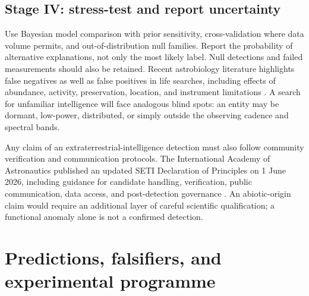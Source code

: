 \documentclass[11pt]{article}
\begin{document}
\subsection{Stage IV: stress-test and report uncertainty}

Use Bayesian model comparison with prior sensitivity, cross-validation where data volume permits, and out-of-distribution null families. Report the probability of alternative explanations, not only the most likely label. Null detections and failed measurements should also be retained. Recent astrobiology literature highlights false negatives as well as false positives in life searches, including effects of abundance, activity, preservation, location, and instrument limitations \citep{tenKate2026}. A search for unfamiliar intelligence will face analogous blind spots: an entity may be dormant, low-power, distributed, or simply outside the observing cadence and spectral bands.

Any claim of an extraterrestrial-intelligence detection must also follow community verification and communication protocols. The International Academy of Astronautics published an updated SETI Declaration of Principles on 1 June 2026, including guidance for candidate handling, verification, public communication, data access, and post-detection governance \citep{IAA2026}. An abiotic-origin claim would require an additional layer of careful scientific qualification; a functional anomaly alone is not a confirmed detection.

\section{Predictions, falsifiers, and experimental programme}
\end{document}
